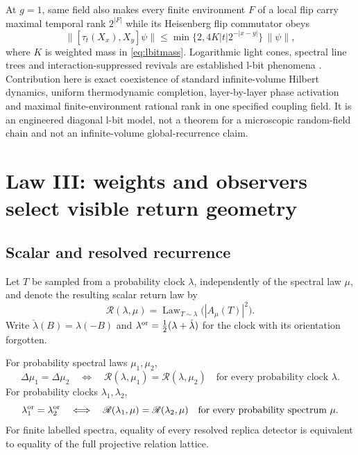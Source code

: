 At $g=1$, same field also makes every finite environment $F$ of a local
flip carry maximal temporal rank $2^{|F|}$ while its Heisenberg flip
commutator obeys
\begin{equation}
 \|[\tau_t(X_x),X_y]\psi\|
 \le \min\{2,4K|t|2^{-|x-y|}\}\,\|\psi\|,                 \label{eq:lbitcone}
\end{equation}
where $K$ is weighted mass in \eqref{eq:lbitmass}.  Logarithmic light cones,
spectral line trees and interaction-suppressed revivals are established l-bit
phenomena \cite{KimChandranAbanin2014,NandkishoreGopalakrishnanHuse2014,
VasseurParameswaranMoore2015}.  Contribution here is exact coexistence of
standard infinite-volume Hilbert dynamics, uniform thermodynamic
completion, layer-by-layer phase activation and maximal finite-environment
rational rank in one specified coupling field.  It is an engineered
diagonal l-bit model, not a theorem for a microscopic random-field chain and
not an infinite-volume global-recurrence claim.

\section{Law III: weights and observers select visible return geometry}

\subsection{Scalar and resolved recurrence}

Let $T$ be sampled from a probability clock $\lambda$, independently of the
spectral law $\mu$, and denote the resulting scalar return law by
\begin{equation}
 \mathscr R(\lambda,\mu)
 =\operatorname{Law}_{T\sim\lambda}\bigl(|A_\mu(T)|^2\bigr). \label{eq:returnlaw}
\end{equation}
Write $\check\lambda(B)=\lambda(-B)$ and
$\lambda^{\rm or}=\tfrac12(\lambda+\check\lambda)$ for the clock with its
orientation forgotten.

\begin{theorem}
\label{thm:informationquotients}
For probability spectral laws $\mu_1,\mu_2$,
\begin{equation}
 \Delta\mu_1=\Delta\mu_2
 \quad\Longleftrightarrow\quad
 \mathscr R(\lambda,\mu_1)=\mathscr R(\lambda,\mu_2)
 \quad\text{for every probability clock }\lambda.     \label{eq:systemquotient}
\end{equation}
For probability clocks $\lambda_1,\lambda_2$,
\begin{equation}
 \lambda_1^{\rm or}=\lambda_2^{\rm or}
 \quad\Longleftrightarrow\quad
 \mathscr R(\lambda_1,\mu)=\mathscr R(\lambda_2,\mu)
 \quad\text{for every probability spectrum }\mu.     \label{eq:clockquotient}
\end{equation}
For finite labelled spectra, equality of every resolved replica detector is
equivalent to equality of the full projective relation lattice.
\end{theorem}

